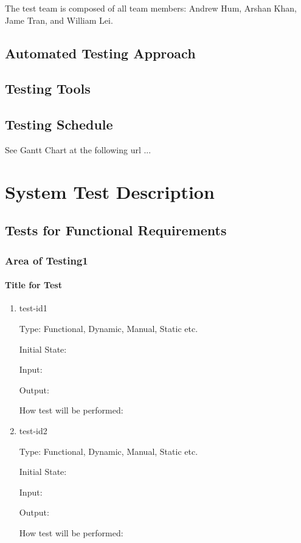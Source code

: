\documentclass[12pt, titlepage]{article}
\begin{document}
The test team is composed of all team members: Andrew Hum, Arshan Khan, Jame Tran, and William Lei.

\subsection{Automated Testing Approach}

\subsection{Testing Tools}

\subsection{Testing Schedule}
		
See Gantt Chart at the following url ...

\section{System Test Description}
	
\subsection{Tests for Functional Requirements}

\subsubsection{Area of Testing1}
		
\paragraph{Title for Test}

\begin{enumerate}

\item{test-id1\\}

Type: Functional, Dynamic, Manual, Static etc.
					
Initial State: 
					
Input: 
					
Output: 
					
How test will be performed: 
					
\item{test-id2\\}

Type: Functional, Dynamic, Manual, Static etc.
					
Initial State: 
					
Input: 
					
Output: 
					
How test will be performed: 

\end{enumerate}
\end{document}
